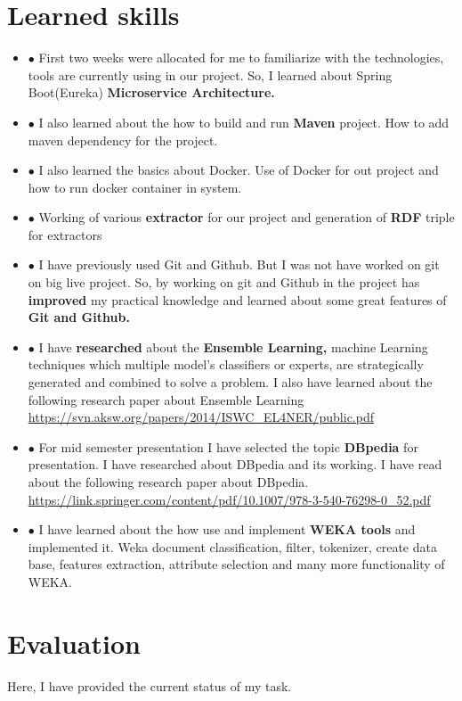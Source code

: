 \documentclass{llncs}
\begin{document}
\section{Learned skills}
\begin {itemize}
\item[$\bullet$ ]  First two weeks were allocated for me to familiarize with the technologies, tools are currently using in our project. So, I learned about Spring Boot(Eureka) \textbf{Microservice Architecture.}
\item[$\bullet$ ]  I also learned about the how to build and run\textbf{ Maven} project. How to add maven dependency for the project.
\item[$\bullet$ ]  I also learned the basics about Docker. Use of Docker for out project and how to run docker container in system. 
\item[$\bullet$ ]  Working of various \textbf{extractor} for our project and generation of\textbf{ RDF} triple for extractors
\item[$\bullet$ ]  I have previously used Git and Github. But I was not have worked on git on big live project. So, by working on git and Github in the project has \textbf{improved} my practical knowledge and learned about some great features of \textbf{Git and Github.}
\item[$\bullet$ ]  I have \textbf{researched }about the \textbf{Ensemble Learning,} machine Learning techniques which multiple model’s classifiers or experts, are strategically generated and combined to solve a problem. I also have learned about the following research paper about Ensemble Learning\\
\color{blue}
\url{https://svn.aksw.org/papers/2014/ISWC_EL4NER/public.pdf}
\color{black}
\item[$\bullet$ ]  For mid semester presentation I have selected the topic \textbf{DBpedia} for presentation. I have researched about DBpedia and its working. I have read about the following research paper about DBpedia.\\
\color{blue}
\url{https://link.springer.com/content/pdf/10.1007/978-3-540-76298-0_52.pdf}
\color{black}
\item[$\bullet$ ] I have learned about the how use and implement\textbf{ WEKA tools} and implemented it. Weka document classification, filter, tokenizer, create data base, features extraction, attribute selection and many more functionality of WEKA.
\end{itemize}


\section{Evaluation}
Here, I have provided the current status of my task.
\end{document}
